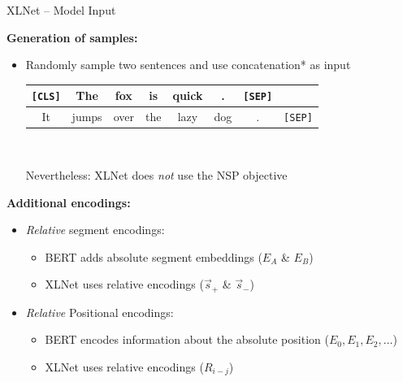 \documentclass[11pt,compress,t,notes=noshow, xcolor=table]{beamer}
\begin{document}
\begin{frame}{XLNet -- Model Input}

\vfill

\textbf{Generation of samples:}

\begin{itemize}
\item Randomly sample two sentences and use concatenation* as input
			{\footnotesize
\begin{center}
\begin{tabular}{|cccccccc|}
\hline
\cellcolor{blue!15}\texttt{[CLS]} & The & fox & is & quick & . & \cellcolor{blue!15}\texttt{[SEP]} &\\\hline\hline It & jumps & over & the & lazy & dog & . & \cellcolor{blue!15}\texttt{[SEP]} \\
\hline
\end{tabular}\\\mbox{}
\end{center}}
{\scriptsize *Nevertheless: XLNet does \textit{not} use the NSP objective }
\end{itemize}

\textbf{Additional encodings:}

\begin{itemize}
\item \textit{Relative} segment encodings:
	\begin{itemize}
		\item BERT adds absolute segment embeddings ($E_A$ \& $E_B$)
		\item XLNet uses relative encodings ($\vec{s}_+$ \& $\vec{s}_-$)
	\end{itemize}
\item \textit{Relative} Positional encodings:
	\begin{itemize}
		\item BERT encodes information about the absolute position ($E_0, E_1, E_2, \hdots$)
		\item XLNet uses relative encodings ($R_{i - j}$)
	\end{itemize}
\end{itemize}

\vfill

\end{frame}

\end{document}
